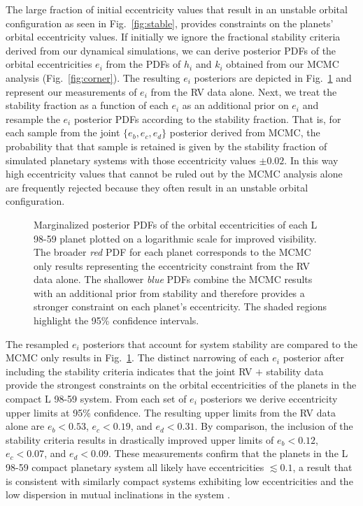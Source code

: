 \documentclass[longauth]{aa}
\begin{document}
The large fraction of initial eccentricity values that result in an unstable orbital configuration as seen in Fig.~\ref{fig:stable}, provides constraints on the planets' orbital eccentricity values. If initially we ignore the fractional stability criteria derived from our dynamical simulations, we can derive posterior PDFs of the orbital eccentricities $e_i$ from the PDFs of $h_i$ and $k_i$ obtained from our MCMC analysis (Fig.~\ref{fig:corner}). The resulting $e_i$ posteriors are depicted in Fig.~\ref{fig:ecc} and represent our measurements of $e_i$ from the RV data alone. Next, we treat the stability fraction as a function of each $e_i$ as an additional prior on $e_i$ and resample the $e_i$ posterior PDFs according to the stability fraction. That is, for each sample from the joint $\{e_b,e_c,e_d \}$ posterior derived from MCMC, the probability that that sample is retained is given by the stability fraction of simulated planetary systems with those eccentricity values $\pm 0.02$. In this way high eccentricity values that cannot be ruled out by the MCMC analysis alone are frequently rejected because they often result in an unstable orbital configuration. 

\begin{figure}
    \centering
    \caption{Marginalized posterior PDFs of the orbital eccentricities of each L 98-59 planet plotted on a logarithmic scale for improved visibility. The broader \emph{red} PDF for each planet corresponds to the MCMC only results representing the eccentricity constraint from the RV data alone. The shallower \emph{blue} PDFs combine the MCMC results with an additional prior from stability and therefore provides a stronger constraint on each planet's eccentricity. The shaded regions highlight the 95\% confidence intervals.}
    \label{fig:ecc}
\end{figure}

The resampled $e_i$ posteriors that account for system stability are compared to the MCMC only results in Fig.~\ref{fig:ecc}. The distinct narrowing of each $e_i$ posterior after including the stability criteria indicates that the joint RV $+$ stability data provide the strongest constraints on the orbital eccentricities of the planets in the compact L 98-59 system. From each set of $e_i$ posteriors we derive eccentricity upper limits at 95\% confidence. The resulting upper limits from the RV data alone are $e_b < 0.53$, $e_c<0.19$, and $e_d < 0.31$. By comparison, the inclusion of the stability criteria results in drastically improved upper limits of $e_b < 0.12$, $e_c<0.07$, and $e_d < 0.09$. These measurements confirm that the planets in the L 98-59 compact planetary system all likely have eccentricities $\lesssim 0.1$, a result that is consistent with similarly compact systems exhibiting low eccentricities \citep{hadden14,vaneylen15} and the low dispersion in mutual inclinations in the system .
\end{document}
